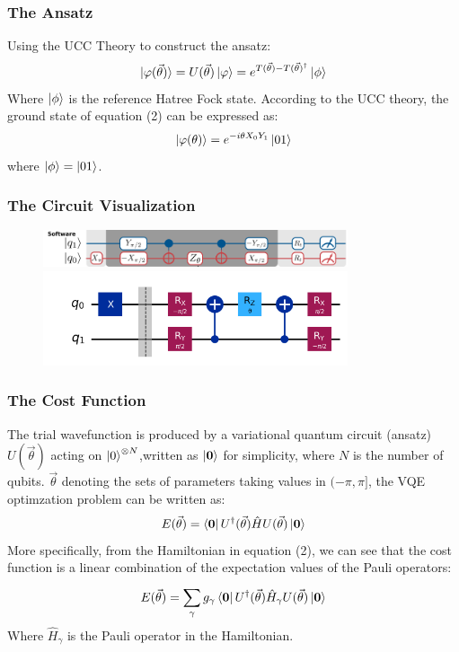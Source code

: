 \documentclass{beamer}
\begin{document}
\begin{frame}
    \frametitle{The Ansatz}
    Using the UCC Theory to construct the ansatz: 
    \begin{equation}
        \ket{\varphi(\vec{\theta})} = U(\vec{\theta})\ket{\varphi} = e^{T(\vec{\theta})- T(\vec{\theta})^{\dagger}} \ket{\phi}
    \end{equation}
    Where \(\ket{\phi}\) is the reference Hatree Fock state. According to the UCC theory, the ground state of equation (2) can be expressed as:
    \begin{equation}
        \ket{\varphi(\theta)} = e^{-i\theta X_0 Y_1} \ket{01} 
    \end{equation}
    where \(\ket{\phi} = \ket{01}\). 
\end{frame}
\begin{frame}
    \frametitle{The Circuit Visualization}
    \begin{figure}
        \centering
        \includegraphics[width=0.8\textwidth]{circuit.png}
        \includegraphics[width=0.8\textwidth]{circuit2.png}
    \end{figure}
\end{frame}
\begin{frame}
    \frametitle{The Cost Function}
    The trial wavefunction is produced by a variational quantum circuit (ansatz) \(U(\vec{\theta})\) acting on \(\ket{0}^{\otimes N}\),written as \(\ket{\textbf{0}}\) for simplicity, where \(N\) is the number of qubits. \(\vec{\theta}\) denoting the sets of parameters taking values in \((- \pi, \pi]\), the VQE optimzation problem can be written as:
    \begin{equation}
        E(\vec{\theta}) = \bra{\textbf{0}} U^{\dagger}(\vec{\theta}) \hat{H} U(\vec{\theta}) \ket{\textbf{0}}
    \end{equation}
    More specifically, from the Hamiltonian in equation (2), we can see that the cost function is a linear combination of the expectation values of the Pauli operators:
    \begin{equation}
        E(\vec{\theta}) = \sum_{\gamma}^{}g_\gamma \bra{\textbf{0}} U^{\dagger}(\vec{\theta}) \hat{H}_\gamma U(\vec{\theta}) \ket{\textbf{0}}
    \end{equation}
    Where \(\hat{H}_\gamma\) is the Pauli operator in the Hamiltonian.
\end{frame}
\end{document}
